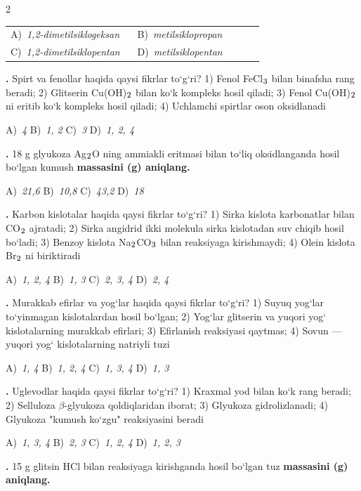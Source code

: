 \documentclass[11pt,a4paper]{article}
\renewcommand{\textsubscript}[1]{\ensuremath{_{\text{\fontsize{8}{8}\selectfont #1}}}}
\newcommand{\qn}[1]{\textbf{\fontsize{11.5}{13}\selectfont #1}}
\newcommand{\qsep}{\par\vspace{1pt}\noindent\rule{0pt}{0.4pt}\par\vspace{5pt}}
\begin{document}
\begin{multicols}{2}
\noindent\begin{tabular}{@{}p{0.47\linewidth}@{}p{0.47\linewidth}@{}}
A)~\textsl{1,2-dimetilsiklogeksan} & B)~\textsl{metilsiklopropan} \\
C)~\textsl{1,2-dimetilsiklopentan} & D)~\textsl{metilsiklopentan} \\
\end{tabular}\par
\qsep
\noindent\qn{23.} Spirt va fenollar haqida qaysi fikrlar to`g`ri? 1) Fenol FeCl\textsubscript{3} bilan binafsha rang beradi; 2) Glitserin Cu(OH)\textsubscript{2} bilan ko`k kompleks hosil qiladi; 3) Fenol Cu(OH)\textsubscript{2} ni eritib ko`k kompleks hosil qiladi; 4) Uchlamchi spirtlar oson oksidlanadi

\noindent A)~\textsl{4} \hfill B)~\textsl{1, 2} \hfill C)~\textsl{3} \hfill D)~\textsl{1, 2, 4}\par
\qsep
\noindent\qn{24.} 18 g glyukoza Ag\textsubscript{2}O ning ammiakli eritmasi bilan to`liq oksidlanganda hosil bo`lgan kumush \textbf{massasini (g) aniqlang.}

\noindent A)~\textsl{21,6} \hfill B)~\textsl{10,8} \hfill C)~\textsl{43,2} \hfill D)~\textsl{18}\par
\qsep
\noindent\qn{25.} Karbon kislotalar haqida qaysi fikrlar to`g`ri? 1) Sirka kislota karbonatlar bilan CO\textsubscript{2} ajratadi; 2) Sirka angidrid ikki molekula sirka kislotadan suv chiqib hosil bo`ladi; 3) Benzoy kislota Na\textsubscript{2}CO\textsubscript{3} bilan reaksiyaga kirishmaydi; 4) Olein kislota Br\textsubscript{2} ni biriktiradi

\noindent A)~\textsl{1, 2, 4} \hfill B)~\textsl{1, 3} \hfill C)~\textsl{2, 3, 4} \hfill D)~\textsl{2, 4}\par
\qsep
\noindent\qn{26.} Murakkab efirlar va yog`lar haqida qaysi fikrlar to`g`ri? 1) Suyuq yog`lar to`yinmagan kislotalardan hosil bo`lgan; 2) Yog`lar glitserin va yuqori yog` kislotalarning murakkab efirlari; 3) Efirlanish reaksiyasi qaytmas; 4) Sovun --- yuqori yog` kislotalarning natriyli tuzi

\noindent A)~\textsl{1, 4} \hfill B)~\textsl{1, 2, 4} \hfill C)~\textsl{1, 3, 4} \hfill D)~\textsl{1, 3}\par
\qsep
\noindent\qn{27.} Uglevodlar haqida qaysi fikrlar to`g`ri? 1) Kraxmal yod bilan ko`k rang beradi; 2) Selluloza $\beta$-glyukoza qoldiqlaridan iborat; 3) Glyukoza gidrolizlanadi; 4) Glyukoza "kumush ko`zgu" reaksiyasini beradi

\noindent A)~\textsl{1, 3, 4} \hfill B)~\textsl{2, 3} \hfill C)~\textsl{1, 2, 4} \hfill D)~\textsl{1, 2, 3}\par
\qsep
\noindent\qn{28.} 15 g glitsin HCl bilan reaksiyaga kirishganda hosil bo`lgan tuz \textbf{massasini (g) aniqlang.}


\end{multicols}
\end{document}
